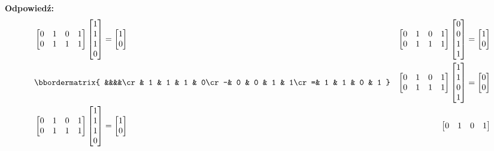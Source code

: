 \begin{enumerate}[label=\alph*)]
\textbf{Odpowiedź: }
\begin{align*}
&\begin{bmatrix}
0& 1& 0& 1\\
0& 1& 1& 1 
\end{bmatrix}\begin{bmatrix}
1\\1\\1\\0
\end{bmatrix}=\begin{bmatrix}
1\\0
\end{bmatrix} & \begin{bmatrix}
0& 1& 0& 1\\
0& 1& 1& 1 
\end{bmatrix}\begin{bmatrix}
0\\0\\1\\1
\end{bmatrix}=\begin{bmatrix}
1\\0
\end{bmatrix}\\
&\bbordermatrix{
&&&&\cr
 & 1 & 1 & 1 & 0\cr
-& 0 & 0 & 1 & 1\cr
=& 1 & 1 & 0 & 1
}& \begin{bmatrix}
0& 1& 0& 1\\
0& 1& 1& 1 
\end{bmatrix}\begin{bmatrix}
1\\1\\0\\1
\end{bmatrix}=\begin{bmatrix}
0\\0
\end{bmatrix}\\
&\begin{bmatrix}
0& 1& 0& 1\\
0& 1& 1& 1 
\end{bmatrix}\begin{bmatrix}
1\\1\\1\\0
\end{bmatrix}=\begin{bmatrix}
1\\0
\end{bmatrix} & \begin{bmatrix}
0& 1& 0& 1\\

\end{bmatrix}
\end{align*}
\end{enumerate}
